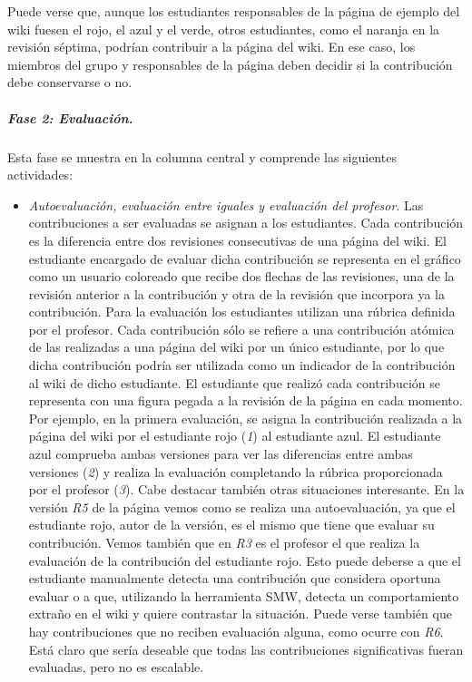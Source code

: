 			Puede verse que, aunque los estudiantes responsables de la página de ejemplo del wiki fuesen el rojo, el azul y el verde, otros estudiantes, como el naranja en la revisión séptima, podrían contribuir a la página del wiki. En ese caso, los miembros del grupo y responsables de la página deben decidir si la contribución debe conservarse o no.

			\subparagraph*{Fase 2: Evaluación.}

			Esta fase se muestra en la columna central y comprende las siguientes actividades:

			\begin{itemize}
				\item \emph{Autoevaluación, evaluación entre iguales y evaluación del profesor}. Las contribuciones a ser evaluadas se asignan a los estudiantes.  Cada contribución es la diferencia entre dos revisiones consecutivas de una página del wiki. El estudiante encargado de evaluar dicha contribución se representa en el gráfico como un usuario coloreado que recibe dos flechas de las revisiones, una de la revisión anterior a la contribución y otra de la revisión que incorpora ya la contribución. Para la evaluación los estudiantes utilizan una rúbrica definida por el profesor. Cada contribución sólo se refiere a una contribución atómica de las realizadas a una página del wiki por un único estudiante, por lo que dicha contribución podría ser utilizada como un indicador de la contribución al wiki de dicho estudiante. El estudiante que realizó cada contribución se representa con una figura pegada a la revisión de la página en cada momento.
Por ejemplo, en la primera evaluación, se asigna la contribución realizada a la página del wiki por el estudiante rojo (\emph{1}) al estudiante azul. El estudiante azul comprueba ambas versiones para ver las diferencias entre ambas versiones (\emph{2}) y realiza la evaluación completando la rúbrica proporcionada por el profesor (\emph{3}).
Cabe destacar también otras situaciones interesante. En la versión \emph{R5} de la página vemos como se realiza una autoevaluación, ya que el estudiante rojo, autor de la versión, es el mismo que tiene que evaluar su contribución. Vemos también que en \emph{R3} es el profesor el que realiza la evaluación de la contribución del estudiante rojo. Esto puede deberse a que el estudiante manualmente detecta una contribución que considera oportuna evaluar o a que, utilizando la herramienta SMW, detecta un comportamiento extraño en el wiki y quiere contrastar la situación. 
Puede verse también que hay contribuciones que no reciben evaluación alguna, como ocurre con \emph{R6}. Está claro que sería deseable que todas las contribuciones significativas fueran evaluadas, pero no es escalable.

\end{itemize}

